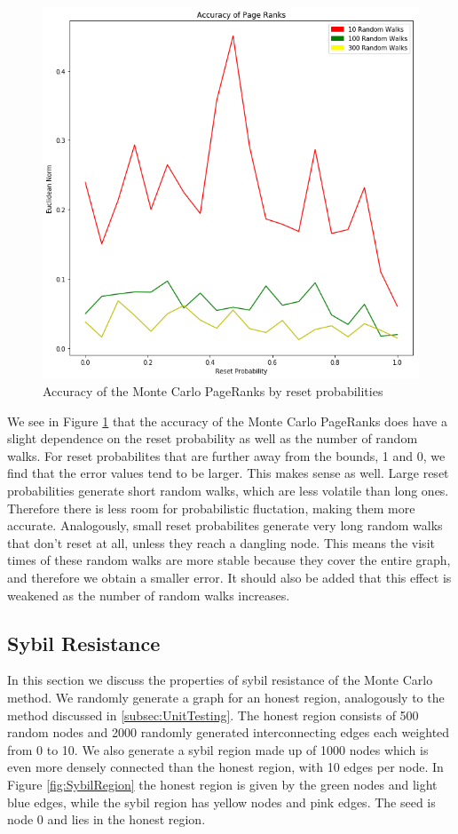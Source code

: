 \documentclass[twocolumn]{article}
\theoremstyle{definition}
\theoremstyle{theorem}
\begin{document}
\begin{figure}
\includegraphics[scale=0.385]{Accuracy2}
\caption{Accuracy of the Monte Carlo PageRanks by reset probabilities}
\label{fig:Accuracy2}
\end{figure}

\noindent We see in Figure \ref{fig:Accuracy2} that the accuracy of the Monte Carlo PageRanks does have a slight dependence on the reset probability as well as the number of random walks. For reset probabilites that are further away from the bounds, 1 and 0, we find that the error values tend to be larger. This makes sense as well. Large reset probabilities generate short random walks, which are less volatile than long ones. Therefore there is less room for probabilistic fluctation, making them more accurate. Analogously, small reset probabilites generate very long random walks that don't reset at all, unless they reach a dangling node. This means the visit times of these random walks are more stable because they cover the entire graph, and therefore we obtain a smaller error. It should also be added that this effect is weakened as the number of random walks increases.
\subsection{Sybil Resistance}
\label{subsec:SybilResistance}
In this section we discuss the properties of sybil resistance of the Monte Carlo method. We randomly generate a graph for an honest region, analogously to the method discussed in \ref{subsec:UnitTesting}. The honest region consists of 500 random nodes and 2000 randomly generated interconnecting edges each weighted from 0 to 10. We also generate a sybil region made up of 1000 nodes which is even more densely connected than the honest region, with 10 edges per node. In Figure \ref{fig:SybilRegion} the honest region is given by the green nodes and light blue edges, while the sybil region has yellow nodes and pink edges. The seed is node 0 and lies in the honest region.\vspace{1em}\\
\end{document}

